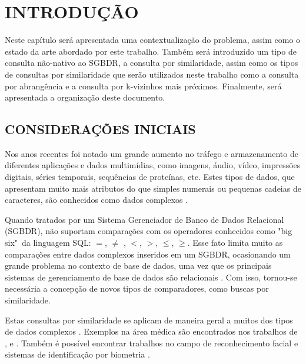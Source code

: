 
\chapter{INTRODUÇÃO}
\label{chap:introducao}

Neste capítulo será apresentada uma contextualização do problema, assim como o estado da arte abordado por este trabalho.
Também será introduzido um tipo de consulta não-nativo ao SGBDR, a consulta por similaridade, assim como os tipos de consultas por similaridade
que serão utilizados neste trabalho como a consulta por abrangência e a consulta por k-vizinhos mais próximos. Finalmente, será apresentada a
organização deste documento.

\section{CONSIDERAÇÕES INICIAIS}
\label{sec:considini}

Nos anos recentes foi notado um grande aumento no tráfego e armazenamento de diferentes aplicações e dados multimídias, como imagens, áudio, vídeo, impressões digitais, séries temporais,
sequências de proteínas, etc. Estes tipos de dados, que apresentam muito mais atributos do que simples numerais ou pequenas cadeias de caracteres, são conhecidos como dados complexos \cite{Zighed2008}.\par
Quando tratados por um Sistema Gerenciador de Banco de Dados Relacional (SGBDR), não suportam comparações com os operadores conhecidos como "big six"\ da linguagem SQL: $=$, $\neq$ , $<$, $>$, $\leq$, $\geq$.
Esse fato limita muito as comparações entre dados complexos inseridos em um SGBDR, ocasionando um grande problema no contexto de base de dados, uma vez que os principais sistemas de gerenciamento
de base de dados são relacionais \cite{DBE2017}. Com isso, tornou-se necessária a concepção de novos tipos de comparadores, como buscas por similaridade.\par 

Estas consultas por similaridade se aplicam de maneira geral a muitos dos tipos de dados complexos \cite{Barioni2009}. Exemplos na área médica são encontrados nos trabalhos de 
\cite{Marchiori2001}, \cite{Bugatti2014} e \cite{Lehmann1999}. Também é possível encontrar trabalhos no campo de reconhecimento facial \cite{Gutta1997} e sistemas de identificação por biometria \cite{Choras2007}.

